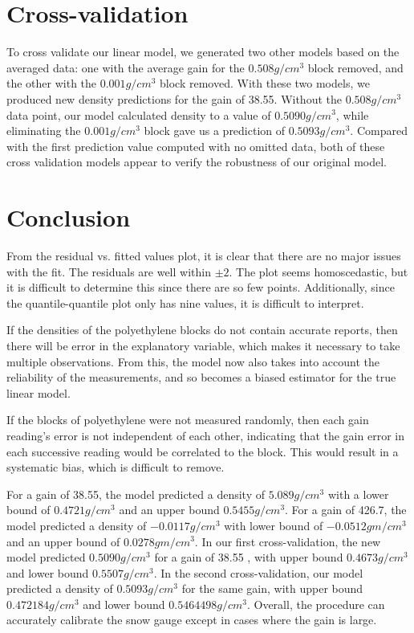 \documentclass[11pt]{article} %
\begin{document}
\section*{Cross-validation}
To cross validate our linear model, we generated two other models based on the averaged data: one with the average gain for the $0.508 g/cm^3$ block removed, and the other with the $0.001 g/cm^3$ block removed. With these two models, we produced new density predictions for the gain of 38.55. Without the $0.508 g/cm^3$ data point, our model calculated density to a value of $0.5090 g/cm^3$, while eliminating the $0.001 g/cm^3$ block gave us a prediction of $0.5093 g/cm^3$. Compared with the first prediction value computed with no omitted data, both of these cross validation models appear to verify the robustness of our original model.

\section*{Conclusion}
From the residual vs. fitted values plot, it is clear that there are no major issues with the fit. The residuals are well within $\pm2$. The plot seems homoscedastic, but it is difficult to determine this since there are so few points. Additionally, since the quantile-quantile plot only has nine values, it is difficult to interpret.

If the densities of the polyethylene blocks do not contain accurate reports, then there will be error in the explanatory variable, which makes it necessary to take multiple observations. From this, the model now also takes into account the reliability of the measurements, and so becomes a biased estimator for the true linear model.

If the blocks of polyethylene were not measured randomly, then each gain reading’s error is not independent of each other, indicating that the gain error in each successive reading would be correlated to the block. This would result in a systematic bias, which is difficult to remove.

For a gain of 38.55, the model predicted a density of $5.089 g/cm^3$ with a lower bound of $0.4721 g/cm^3$ and an upper bound $0.5455 g/cm^3$. For a gain of 426.7, the model predicted a density of $-0.0117 g/cm^3$ with lower bound of $-0.0512 gm/cm^3$ and an upper bound of  $0.0278 gm/cm^3$. In our first cross-validation, the new model predicted $0.5090 g/cm^3$ for a gain of 38.55 , with upper bound $0.4673 g/cm^3$ and lower bound $0.5507 g/cm^3$. In the second cross-validation, our model predicted a density of $0.5093 g/cm^3$ for the same gain, with upper bound $0.472184 g/cm^3$ and lower bound $0.5464498 g/cm^3$. Overall, the procedure can accurately calibrate the snow gauge except in cases where the gain is large.
\end{document}
